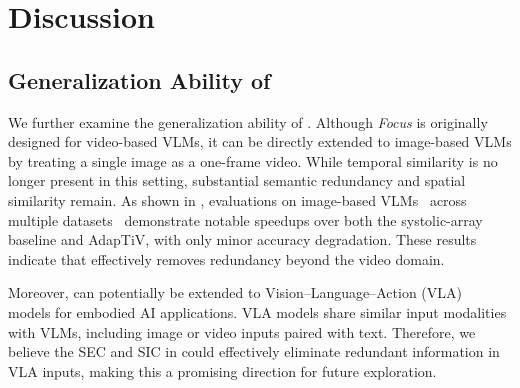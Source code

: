 {\section{Discussion}
\label{sec:disc}


\subsection{Generalization Ability of \proj}
{We further examine the generalization ability of \proj. Although \textit{Focus} is originally designed for video-based VLMs, it can be directly extended to image-based VLMs by treating a single image as a one-frame video. While temporal similarity is no longer present in this setting, substantial semantic redundancy and spatial similarity remain. As shown in , evaluations on image-based VLMs~\cite{li2024llava,bai2025qwen2} across multiple datasets~\cite{goyal2017making,liu2024mmbench,zhang2021mme} demonstrate notable speedups over both the systolic-array baseline and AdapTiV, with only minor accuracy degradation. These results indicate that \proj effectively removes redundancy beyond the video domain.}

Moreover, \proj can potentially be extended to Vision--Language--Action (VLA)~\cite{kim2024openvla,intelligence2504pi0} models for embodied AI applications. VLA models share similar input modalities with VLMs, including image or video inputs paired with text. Therefore, we believe the SEC and SIC in \proj could effectively eliminate redundant information in VLA inputs, making this a promising direction for future exploration.


}
